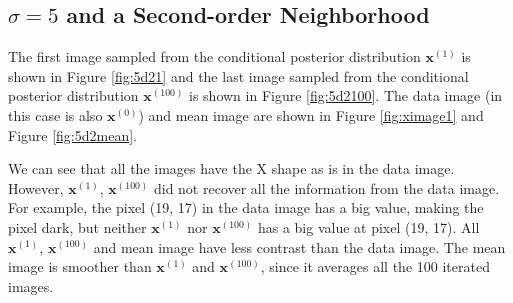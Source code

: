 \subsection{\boldmath$\sigma=5$ and a Second-order Neighborhood}
The first image sampled from the conditional posterior distribution $\mathbf{x}^{(1)}$ is shown in Figure \ref{fig:5d21} and the last image sampled from the conditional posterior distribution $\mathbf{x}^{(100)}$ is shown in Figure \ref{fig:5d2100}. 
The data image (in this case is also $\mathbf{x}^{(0)}$) and mean image are shown in Figure \ref{fig:ximage1} and Figure \ref{fig:5d2mean}.

We can see that all the images have the X shape as is in the data image.
However, $\mathbf{x}^{(1)}$, $\mathbf{x}^{(100)}$ did not recover all the information from the data image. 
For example, the pixel (19, 17) in the data image has a big value, making the pixel dark, but neither $\mathbf{x}^{(1)}$ nor $\mathbf{x}^{(100)}$ has a big value at pixel (19, 17). 
All $\mathbf{x}^{(1)}$, $\mathbf{x}^{(100)}$ and mean image have less contrast than the data image. 
The mean image is smoother than $\mathbf{x}^{(1)}$ and $\mathbf{x}^{(100)}$, since it averages all the 100 iterated images.
